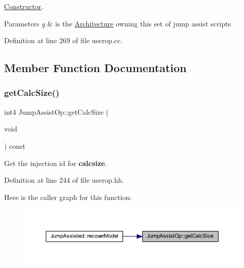 \mbox{\hyperlink{class_constructor}{Constructor}}. 


\begin{DoxyParams}{Parameters}
{\em g} & is the \mbox{\hyperlink{class_architecture}{Architecture}} owning this set of jump assist scripts \\
\hline
\end{DoxyParams}


Definition at line 269 of file userop.\+cc.



\subsection{Member Function Documentation}
\mbox{\label{class_jump_assist_op_a9fdcdb39841863da460a5aef7d6d60df}} 
\subsubsection{\texorpdfstring{getCalcSize()}{getCalcSize()}}
{\footnotesize\ttfamily int4 Jump\+Assist\+Op\+::get\+Calc\+Size (\begin{DoxyParamCaption}\item[{void}]{ }\end{DoxyParamCaption}) const\hspace{0.3cm}{\ttfamily [inline]}}



Get the injection id for {\bfseries{calcsize}}. 



Definition at line 244 of file userop.\+hh.

Here is the caller graph for this function\+:
\nopagebreak
\begin{figure}[H]
\begin{center}
\leavevmode
\includegraphics[width=350pt]{class_jump_assist_op_a9fdcdb39841863da460a5aef7d6d60df_icgraph}
\end{center}
\end{figure}
\mbox{\label{class_jump_assist_op_a23c4ab9487662316df6ae952522bbf3d}} 
